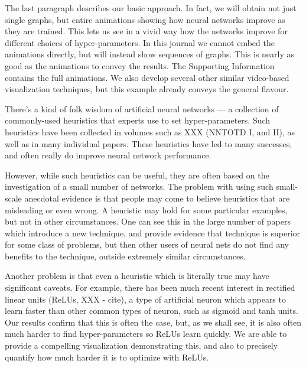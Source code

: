 \documentclass[10pt]{article}
\begin{document}
%
%
The last paragraph describes our basic approach.  In fact, we will
obtain not just single graphs, but entire animations showing how
neural networks improve as they are trained.  This lets us see in a
vivid way how the networks improve for different choices of
hyper-parameters.  In this journal we cannot embed the animations
directly, but will instead show sequences of graphs.  This is nearly
as good as the animations to convey the results.  The Supporting
Information contains the full animations.  We also develop several
other similar video-based visualization techniques, but this example
already conveys the general flavour.

%
%
There's a kind of folk wisdom of artificial neural networks --- a
collection of commonly-used heuristics that experts use to set
hyper-parameters.  Such heuristics have been collected in volumes such
as XXX (NNTOTD I, and II), as well as in many individual papers.
These heuristics have led to many successes, and often really do
improve neural network performance.

%
%
However, while such heuristics can be useful, they are often based on
the investigation of a small number of networks.  The problem with
using such small-scale anecdotal evidence is that people may come to
believe heuristics that are misleading or even wrong.  A heuristic may
hold for some particular examples, but not in other circumstances.
One can see this in the large number of papers which introduce a new
technique, and provide evidence that technique is superior for some
class of problems, but then other users of neural nets do not find any
benefits to the technique, outside extremely similar circumstances.

%
%
Another problem is that even a heuristic which is literally true may
have significant caveats.  For example, there has been much recent
interest in rectified linear units (ReLUs, XXX - cite), a type of
artificial neuron which appears to learn faster than other common
types of neuron, such as sigmoid and tanh units.  Our results confirm
that this is often the case, but, as we shall see, it is also often
much harder to find hyper-parameters so ReLUs learn quickly.  We are
able to provide a compelling visualization demonstrating this, and
also to precisely quantify how much harder it is to optimize with
ReLUs.
\end{document}
